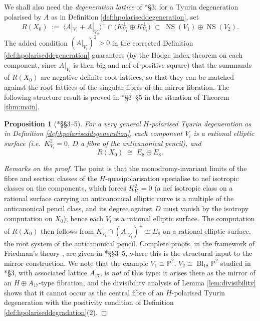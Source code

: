 \documentclass[11pt]{amsart}
\theoremstyle{plain}
\newtheorem{proposition}[theorem]{Proposition}
\theoremstyle{definition}
\newcommand{\NS}{\operatorname{NS}}
\begin{document}
We shall also need the \emph{degeneration lattice} of
\cite{dfk3slpms}*{\S 3}: for a Tyurin degeneration polarised by $A$ as in
Definition \ref{def:hpolariseddegeneration}, set
\[
R(X_0)\;:=\;\bigl\langle A|_{V_1}+A|_{V_2}\bigr\rangle^\perp\cap
\bigl(K_{V_1}^{\perp}\oplus K_{V_2}^{\perp}\bigr)
\;\subset\; \NS(V_1)\oplus \NS(V_2).
\]
The added condition $(A|_{V_i})^2>0$ in the corrected Definition
\ref{def:hpolariseddegeneration} guarantees (by the Hodge index theorem on each
component, since $A|_{V_i}$ is then big and nef of positive square) that the
summands of $R(X_0)$ are negative definite root lattices, so that they can be
matched against the root lattices of the singular fibres of the mirror fibration.
The following structure result is proved in \cite{dfk3slpms}*{\S 3--\S 5} in the
situation of Theorem \ref{thm:main}.

\begin{proposition}[{\cite{dfk3slpms}*{\S\S 3--5}}]\label{prop:componentlattice}
For a very general $H$-polarised Tyurin degeneration as in
Definition \ref{def:hpolariseddegeneration}, each component $V_i$ is a
rational elliptic surface (i.e.\ $K_{V_i}^2=0$, $D$ a fibre of the
anticanonical pencil), and
\[
R(X_0)\;\cong\;E_8\oplus E_8.
\]
\end{proposition}

\begin{proof}[Remarks on the proof]
The point is that the monodromy-invariant limits of the fibre and section
classes of the $H$-quasipolarisation specialise to nef isotropic classes on the
components, which forces $K_{V_i}^2=0$ (a nef isotropic class on a rational
surface carrying an anticanonical elliptic curve is a multiple of the
anticanonical pencil class, and its degree against $D$ must vanish by the
isotropy computation on $X_0$); hence each $V_i$ is a rational elliptic
surface. The computation of $R(X_0)$ then follows from
$K_{V_i}^\perp\cap (A|_{V_i})^\perp \cong E_8$ on a rational elliptic surface,
the root system of the anticanonical pencil. Complete proofs, in the framework
of Friedman's theory \cite{Fri83}, are given in \cite{dfk3slpms}*{\S\S 3--5},
where this is the structural input to the mirror construction. We note that
the example $V_1\cong\mathbb{P}^2$, $V_2\cong \operatorname{Bl}_{18}\mathbb{P}^2$
studied in \cite{dfk3slpms}*{\S 3}, with associated lattice $A_{17}$, is
\emph{not} of this type: it arises there as the mirror of an
$H\oplus A_{17}$-type fibration, and the divisibility analysis of
Lemma \ref{lem:divisibility} shows that it cannot occur as the central fibre of
an $H$-polarised Tyurin degeneration with the positivity condition of
Definition \ref{def:hpolariseddegradation}(2).
\end{proof}
\end{document}

